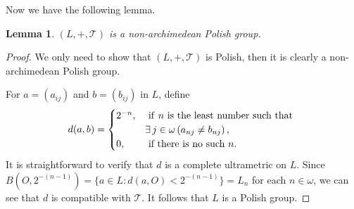 \documentclass[11pt]{amsart}
\newtheorem{lemma}[theorem]{Lemma}
\theoremstyle{definition}
\theoremstyle{remark}
\newtheorem{remark}[theorem]{Remark}
\numberwithin{equation}{section}
\def\Z {{\mathbb{Z}}}
\def\hom{{\mathrm{Hom}}}
\def\dsZ{{\Z^*}}
\def\itx#1{{\mbox{\textrm{ #1 }}}}
\def\itxr#1{{\mbox{\textrm{ #1}}}}
\begin{document}
Now we have the following lemma.
\begin{lemma}
    $(L,+,\mathcal{T})$ is a non-archimedean Polish group.
\end{lemma}
\begin{proof}
We only need to show that $(L,+,\mathcal{T})$ is Polish, then it is clearly a non-archimedean Polish group.

    For $a=(a_{ij})$ and $b=(b_{ij})$ in $L$, define
    \begin{align*}
        d(a,b)=\begin{cases}
            2^{-n},&\itx{if}n\itx{is the least number such that}\\
            &\exists\,j\in\omega\left(a_{nj}\neq b_{nj}\right),\\
            0,&\itx{if there is no such}n.
        \end{cases}
    \end{align*}
    It is straightforward to verify that $d$ is a complete ultrametric on $L$. Since $B(O,2^{-(n-1)})=\{a\in L:d(a,O)<2^{-(n-1)}\}=L_n$ for each $n\in\omega$, we can see that $d$ is compatible with $\mathcal{T}$. It follows that $L$ is a Polish group.
\end{proof}

\end{document}
